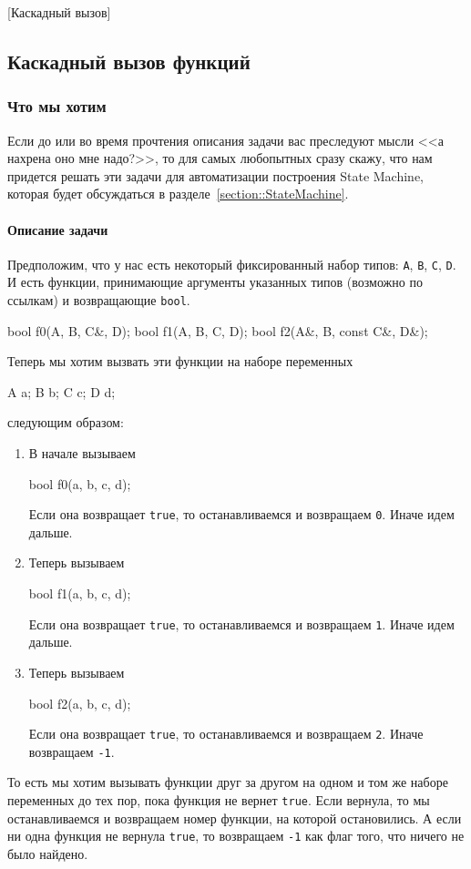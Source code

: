[Каскадный вызов]


\subsection{Каскадный вызов функций}

\subsubsection{Что мы хотим}

Если до или во время прочтения описания задачи вас преследуют мысли <<а нахрена оно мне надо?>>, то для самых любопытных сразу скажу, что нам придется решать эти задачи для автоматизации построения State Machine, которая будет обсуждаться в разделе~\ref{section::StateMachine}.

\paragraph{Описание задачи}

Предположим, что у нас есть некоторый фиксированный набор типов: \verb"A", \verb"B", \verb"C", \verb"D".
И есть функции, принимающие аргументы указанных типов (возможно по ссылкам) и возвращающие \verb"bool".
\begin{cppcode}[\nonumbers]
bool f0(A, B, C&, D);
bool f1(A, B, C, D);
bool f2(A&, B, const C&, D&);
\end{cppcode}
Теперь мы хотим вызвать эти функции на наборе переменных
\begin{cppcode}[\nonumbers]
A a; B b; C c; D d;
\end{cppcode}
следующим образом:
\begin{enumerate}
\item В начале вызываем
\begin{cppcode}[\nonumbers]
bool f0(a, b, c, d);
\end{cppcode}
Если она возвращает \verb"true", то останавливаемся и возвращаем \verb"0".
Иначе идем дальше.

\item Теперь вызываем
\begin{cppcode}[\nonumbers]
bool f1(a, b, c, d);
\end{cppcode}
Если она возвращает \verb"true", то останавливаемся и возвращаем \verb"1".
Иначе идем дальше.

\item Теперь вызываем
\begin{cppcode}[\nonumbers]
bool f2(a, b, c, d);
\end{cppcode}
Если она возвращает \verb"true", то останавливаемся и возвращаем \verb"2".
Иначе возвращаем \verb"-1".
\end{enumerate}
То есть мы хотим вызывать функции друг за другом на одном и том же наборе переменных до тех пор, пока функция не вернет \verb"true".
Если вернула, то мы останавливаемся и возвращаем номер функции, на которой остановились.
А если ни одна функция не вернула \verb"true", то возвращаем \verb"-1" как флаг того, что ничего не было найдено.

